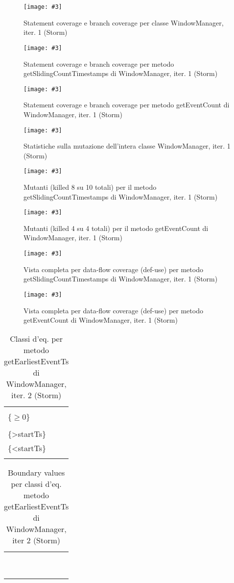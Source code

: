 \documentclass[10pt, a4paper]{article}
\newcommand{\Intmaketable}[4]{
	\begin{longtable}{#3}
	#4
	\caption{#2}
	\label{#1}
	\end{longtable}
}
\newcommand{\Intceqtable}[3]{
	\Intmaketable{#1}{#2}{|l|l|}{
	\hline
	\thead{Parametro formale} & \thead{Classi d'equivalenza} \\
	\hline
	\hline
	#3
	\hline}
}
\newcommand{\Intbvtable}[3]{
	\Intmaketable{#1}{#2}{|l|l|l|}{
	\hline
	\thead{Parametro formale} & \thead{Classe d'equivalenza} & \thead{Boundary value}\\
	\hline
	\hline
	#3
	\hline}
}
\newcommand{\Intceqcaption}[4]{Classi d'eq. per metodo #1 di #2, iter. #3 (#4)}
\newcommand{\Intbvcaption}[4]{Boundary values per classi d'eq. metodo #1 di #2, iter #3 (#4)}
\newcommand{\gettablelabel}[5]{table:#1:#2:#3:iter#4:proj#5}
\newcommand{\ceqtable}[5]{
	\Intceqtable{\gettablelabel{ceq}{#1}{#2}{#3}{#4}}
		{\Intceqcaption{#1}{#2}{#3}{#4}}
		{#5}
}
\newcommand{\bvtable}[5]{
	\Intbvtable{\gettablelabel{bv}{#1}{#2}{#3}{#4}}
		{\Intbvcaption{#1}{#2}{#3}{#4}}
		{#5}
}
\newcommand{\getpicturelabel}[1]{picture:#1}
\newcommand{\makepicture}[4]{
	\begin{figure}[H]
	\centering
	\texttt{[image: \#3]}
	\caption{#4}
	\label{\getpicturelabel{#3}}
	\end{figure}
}
\newcommand{\alldfcovcaption}[4]{Vista completa per data-flow coverage (def-use) per metodo #1 di #2, iter. #3 (#4)}
\newcommand{\methodcfcovcaption}[4]{Statement coverage e branch coverage per metodo #1 di #2, iter. #3 (#4)}
\newcommand{\classcfcovcaption}[3]{Statement coverage e branch coverage per classe #1, iter. #2 (#3)}
\newcommand{\mutclasscaption}[3]{Statistiche sulla mutazione dell'intera classe #1, iter. #2 (#3)}
\newcommand{\mutmethodcaption}[6]{Mutanti (killed #5 su #6 totali) per il metodo #1 di #2, iter. #3 (#4)}
\newcommand{\tcell}{\makecell[tl]}
\newcommand{\newtrow}{\\ \hline}
\def\storm{Storm}
\newcommand{\ceq}[1]{\{#1\}}
\begin{document}
	\makepicture{17.5cm}{1.25cm}{storm/controlflow-WindowManager-1}
				{\classcfcovcaption{WindowManager}{1}{\storm}}
				
	\makepicture{17cm}{0.75cm}{storm/controlflow-getSlidingCountTimestamps-WindowManager-1}
				{\methodcfcovcaption{getSlidingCountTimestamps}{WindowManager}{1}{\storm}}
				
	\makepicture{17cm}{0.75cm}{storm/controlflow-getEventCount-WindowManager-1}
				{\methodcfcovcaption{getEventCount}{WindowManager}{1}{\storm}}
				
	\makepicture{17cm}{1.5cm}{storm/mutation-WindowManager-1}
				{\mutclasscaption{WindowManager}{1}{\storm}}
				
	\makepicture{17cm}{7cm}{storm/mutation-getSlidingCountTimestamps-WindowManager-1}
				{\mutmethodcaption{getSlidingCountTimestamps}{WindowManager}{1}{\storm}{8}{10}}
	
	\makepicture{11cm}{4cm}{storm/mutation-getEventCount-WindowManager-1}
				{\mutmethodcaption{getEventCount}{WindowManager}{1}{\storm}{4}{4}}
				
	\makepicture{13cm}{15cm}{storm/dataflow-getSlidingCountTimestamps-WindowManager-1}
				{\alldfcovcaption{getSlidingCountTimestamps}{WindowManager}{1}{\storm}}
				
	\makepicture{12cm}{6cm}{storm/dataflow-getEventCount-WindowManager-1}
				{\alldfcovcaption{getEventCount}{WindowManager}{1}{\storm}}
	
	
	\ceqtable{getEarliestEventTs}{WindowManager}{2}{\storm}{
			\tcell{startTs} &
			\tcell{\ceq{$< 0$}\\\ceq{$\ge 0$}}
		\newtrow
			\tcell{endTs} &
			\tcell{\ceq{=startTs}\\\ceq{>startTs}\\\ceq{<startTs}}
		\newtrow
	}
	
	\bvtable{getEarliestEventTs}{WindowManager}{2}{\storm}{
			\tcell{startTs} &
			\tcell{\ceq{$< 0$}} &
			\tcell{$-1$}
		\newtrow
			\tcell{startTs} &
			\tcell{\ceq{$\ge 0$}} &
			\tcell{$0$}
		\newtrow
			\tcell{endTs} &
			\tcell{\ceq{=startTs}} &
			\tcell{$-1$}
		\newtrow
			\tcell{endTs} &
			\tcell{\ceq{=startTs}} &
			\tcell{$0$}
		\newtrow
			\tcell{endTs} &
			\tcell{\ceq{>startTs}} &
			\tcell{$0$}
		\newtrow
			\tcell{endTs} &
			\tcell{\ceq{>startTs}} &
			\tcell{$1$}
		\newtrow
			\tcell{endTs} &
			\tcell{\ceq{<startTs}} &
			\tcell{$-2$}
		\newtrow
			\tcell{endTs} &
			\tcell{\ceq{<startTs}} &
			\tcell{$-1$}
		\newtrow
	}
	
\end{document}
